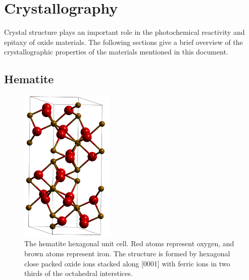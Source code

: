 \section{Crystallography}
\label{sec:background.crystallography}


Crystal structure plays an important role in the photochemical reactivity and epitaxy of
oxide materials. The following sections give a brief overview of the crystallographic
properties of the materials mentioned in this document.

\subsection{Hematite}
\label{subsec:background.hematite}

\begin{figure}
\centering
\includegraphics[width=0.4\textwidth]{hematitecell.png}
\caption[Hexagonal hematite unit cell]{%
	The hematite hexagonal unit cell. Red atoms represent oxygen, and brown atoms
represent iron.  The structure is formed by hexagonal close packed oxide ions stacked
along [0001] with ferric ions in two thirds of the octahedral interstices.}
\label{fig:hematitecell}

\end{figure}

